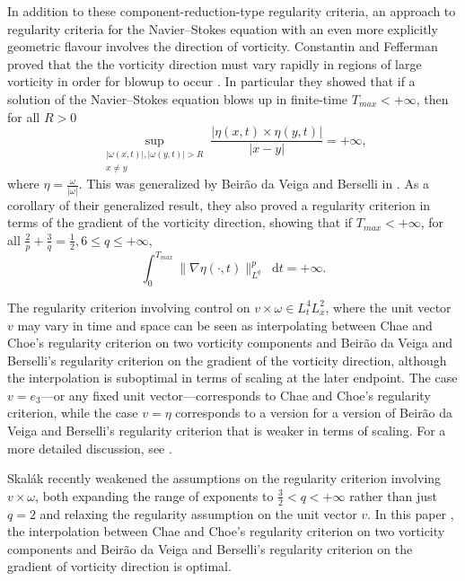 \documentclass[11pt]{article}
\theoremstyle{plain}
\theoremstyle{remark}
\numberwithin{equation}{section}
\newcommand{\diff}{\mathop{}\!\mathrm{d}}
\begin{document}
In addition to these component-reduction-type regularity criteria, an approach to regularity criteria for the Navier--Stokes equation with an even more explicitly geometric flavour involves the direction of vorticity.
Constantin and Fefferman proved that the the vorticity direction must vary rapidly in regions of large vorticity in order for blowup to occur \cite{ConstantinFefferman}.
In particular they showed that if a solution of the Navier--Stokes equation blows up in finite-time $T_{max}<+\infty$, then for all $R>0$
\begin{equation}
    \sup_{\substack{
    |\omega(x,t)|,|\omega(y,t)|>R \\
    x\neq y}} 
    \frac{|\eta(x,t)\times\eta(y,t)|}{|x-y|}
    =+\infty,
\end{equation}
where $\eta=\frac{\omega}{|\omega|}$.
This was generalized by Beir\~ao da Veiga and Berselli in \cite{daVeigaBerselli}.
As a corollary of their generalized result, they also proved a regularity criterion in terms of the gradient of the vorticity direction, showing that if $T_{max}<+\infty$, for all $\frac{2}{p}+\frac{3}{q}=\frac{1}{2},
6\leq q \leq +\infty$,
\begin{equation}
    \int_0^{T_{max}}
    \|\nabla \eta(\cdot,t)\|_{L^q}^p 
    \diff t
    =+\infty.
\end{equation}

The regularity criterion involving control on 
$v\times \omega \in L^4_tL^2_x$, where the unit vector $v$ may vary in time and space can be seen as interpolating between Chae and Choe's regularity criterion on two vorticity components and Beir\~ao da Veiga and Berselli's regularity criterion on the gradient of the vorticity direction, although the interpolation is suboptimal in terms of scaling at the later endpoint. The case $v=e_3$---or any fixed unit vector---corresponds to Chae and Choe's regularity criterion, while the case $v=\eta$ corresponds to a version for a version of Beir\~ao da Veiga and Berselli's regularity criterion that is weaker in terms of scaling.
For a more detailed discussion, see \cite{MillerAnisoVort}.

Skal\'ak recently weakened the assumptions on the regularity criterion involving $v\times\omega$, both expanding the range of exponents to $\frac{3}{2}<q<+\infty$ rather than just $q=2$ and relaxing the regularity assumption on the unit vector $v$. In this paper \cite{SkalakVort}, the interpolation between Chae and Choe's regularity criterion on two vorticity components and Beir\~ao da Veiga and Berselli's regularity criterion on the gradient of vorticity direction is optimal.
\end{document}
